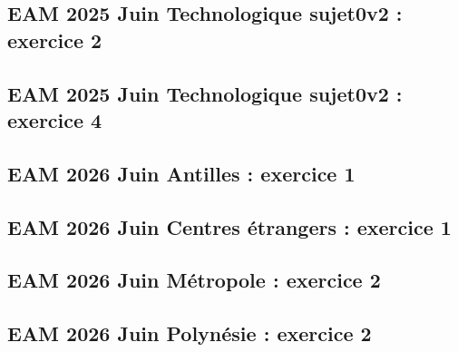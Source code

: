\documentclass[lang=fr,edition=teacher,layout=sheet]{mxbook}
\begin{document}
\begingroup\endgroup
\par\bigskip
{}\subsection*{EAM 2025 Juin Technologique sujet0v2 : exercice 2}
\begingroup\endgroup
\par\bigskip
{}\subsection*{EAM 2025 Juin Technologique sujet0v2 : exercice 4}
\begingroup\endgroup
\par\bigskip
{}\subsection*{EAM 2026 Juin Antilles : exercice 1}
\begingroup\endgroup
\par\bigskip
{}\subsection*{EAM 2026 Juin Centres étrangers : exercice 1}
\begingroup\endgroup
\par\bigskip
{}\subsection*{EAM 2026 Juin Métropole : exercice 2}
\begingroup\endgroup
\par\bigskip
{}\subsection*{EAM 2026 Juin Polynésie : exercice 2}
\begingroup\endgroup
\par\bigskip
\end{document}

